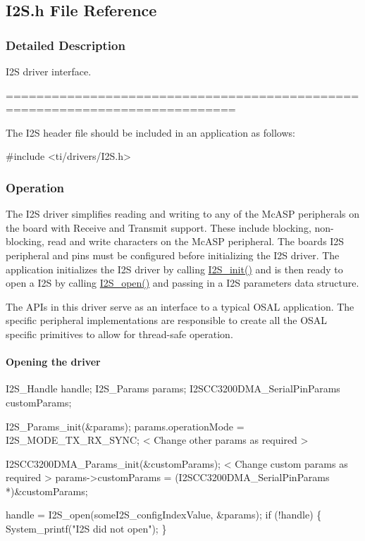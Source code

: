 \subsection{I2\+S.\+h File Reference}
\label{_i2_s_8h}


\subsubsection{Detailed Description}
I2\+S driver interface. 

============================================================================

The I2\+S header file should be included in an application as follows\+: 
\begin{DoxyCode}
\textcolor{preprocessor}{#include <ti/drivers/I2S.h>}
\end{DoxyCode}


\subsubsection*{Operation}

The I2\+S driver simplifies reading and writing to any of the Mc\+A\+S\+P peripherals on the board with Receive and Transmit support. These include blocking, non-\/blocking, read and write characters on the Mc\+A\+S\+P peripheral. The board\textquotesingle{}s I2\+S peripheral and pins must be configured before initializing the I2\+S driver. The application initializes the I2\+S driver by calling \hyperlink{_i2_s_8h_a79e8fdf40ee80c49b2cac09a3e428a82}{I2\+S\+\_\+init()} and is then ready to open a I2\+S by calling \hyperlink{_i2_s_8h_aad4ce7cbdf38dc5597f5a92ad056ebc1}{I2\+S\+\_\+open()} and passing in a I2\+S parameters data structure.

The A\+P\+Is in this driver serve as an interface to a typical O\+S\+A\+L application. The specific peripheral implementations are responsible to create all the O\+S\+A\+L specific primitives to allow for thread-\/safe operation.

\paragraph*{Opening the driver}


\begin{DoxyCode}
I2S_Handle      handle;
I2S_Params      params;
I2SCC3200DMA\_SerialPinParams customParams;

I2S_Params_init(&params);
params.operationMode                     = I2S\_MODE\_TX\_RX\_SYNC;
< Change other params as required >

I2SCC3200DMA\_Params\_init(&customParams);
< Change custom params as required >
params->customParams = (I2SCC3200DMA\_SerialPinParams *)&customParams;

handle = I2S_open(someI2S\_configIndexValue, &params);
\textcolor{keywordflow}{if} (!handle) \{
    System\_printf(\textcolor{stringliteral}{"I2S did not open"});
\}
\end{DoxyCode}


